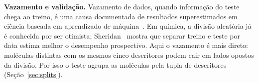 \textbf{Vazamento e validação.} Vazamento de dados, quando informação do teste chega ao treino, é uma causa documentada de resultados superestimados em ciência baseada em aprendizado de máquina~\cite{kapoor:23}. Em química, a divisão aleatória já é conhecida por ser otimista; Sheridan~\cite{sheridan:13} mostra que separar treino e teste por data estima melhor o desempenho prospectivo. Aqui o vazamento é mais direto: moléculas distintas com os mesmos cinco descritores podem cair em lados opostos da divisão. Por isso o teste agrupa as moléculas pela tupla de descritores (Seção~\ref{sec:splits}).
